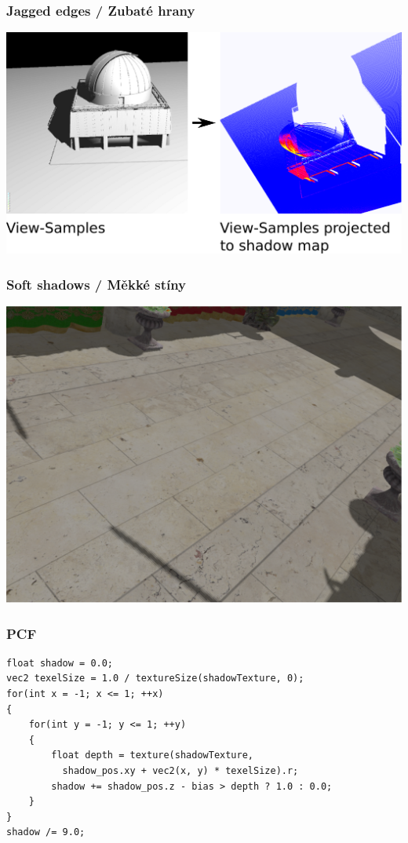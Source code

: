 \begin{frame}\frametitle{Jagged edges / Zubaté hrany}
  \includegraphics[width=\textwidth]{pics/shadows/shadowMapping/projectedShadowSamples}
\end{frame}

\begin{frame}\frametitle{Soft shadows / Měkké stíny}
  \includegraphics[width=\textwidth]{pics/shadows/shadowMapping/pcf_nearest.eps}
\end{frame}

\begin{frame}[fragile]\frametitle{PCF}
{\small
\begin{verbatim}
float shadow = 0.0;
vec2 texelSize = 1.0 / textureSize(shadowTexture, 0);
for(int x = -1; x <= 1; ++x)
{
    for(int y = -1; y <= 1; ++y)
    {
        float depth = texture(shadowTexture, 
          shadow_pos.xy + vec2(x, y) * texelSize).r; 
        shadow += shadow_pos.z - bias > depth ? 1.0 : 0.0;        
    }    
}
shadow /= 9.0;

  \end{verbatim}
}
\end{frame}

